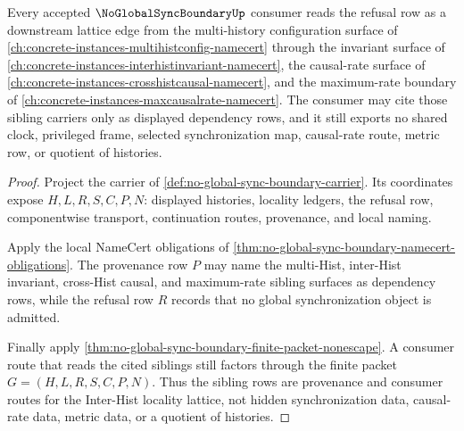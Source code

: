 \begin{theorem}
\label{thm:no-global-sync-boundary-multihist-lattice-link}
Every accepted $\NoGlobalSyncBoundaryUp$ consumer reads the refusal row as a downstream lattice edge from the multi-history configuration surface of \autoref{ch:concrete-instances-multihistconfig-namecert} through the invariant surface of \autoref{ch:concrete-instances-interhistinvariant-namecert}, the causal-rate surface of \autoref{ch:concrete-instances-crosshistcausal-namecert}, and the maximum-rate boundary of \autoref{ch:concrete-instances-maxcausalrate-namecert}. The consumer may cite those sibling carriers only as displayed dependency rows, and it still exports no shared clock, privileged frame, selected synchronization map, causal-rate route, metric row, or quotient of histories.
\end{theorem}
\begin{proof}
Project the carrier of \autoref{def:no-global-sync-boundary-carrier}. Its coordinates expose $H,L,R,S,C,P,N$: displayed histories, locality ledgers, the refusal row, componentwise transport, continuation routes, provenance, and local naming.

Apply the local NameCert obligations of \autoref{thm:no-global-sync-boundary-namecert-obligations}. The provenance row $P$ may name the multi-Hist, inter-Hist invariant, cross-Hist causal, and maximum-rate sibling surfaces as dependency rows, while the refusal row $R$ records that no global synchronization object is admitted.

Finally apply \autoref{thm:no-global-sync-boundary-finite-packet-nonescape}. A consumer route that reads the cited siblings still factors through the finite packet $G=(H,L,R,S,C,P,N)$. Thus the sibling rows are provenance and consumer routes for the Inter-Hist locality lattice, not hidden synchronization data, causal-rate data, metric data, or a quotient of histories.
\end{proof}

